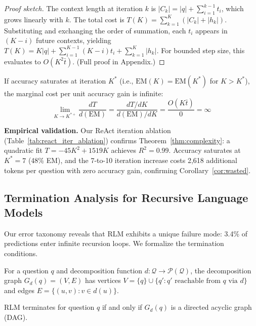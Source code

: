 \begin{proof}[Proof sketch]
The context length at iteration $k$ is $|C_k| = |q| + \sum_{i=1}^{k-1} t_i$, which grows linearly with $k$. The total cost is $T(K) = \sum_{k=1}^{K}(|C_k| + |h_k|)$. Substituting and exchanging the order of summation, each $t_i$ appears in $(K-i)$ future contexts, yielding $T(K) = K|q| + \sum_{i=1}^{K-1}(K-i)t_i + \sum_{k=1}^{K}|h_k|$. For bounded step size, this evaluates to $O(K^2 \bar{t})$. (Full proof in Appendix.)
\end{proof}

\begin{corollary}
\label{cor:wasted}
If accuracy saturates at iteration $K^*$ (i.e., $\mathrm{EM}(K) = \mathrm{EM}(K^*)$ for $K > K^*$), the marginal cost per unit accuracy gain is infinite:
\begin{equation}
\lim_{K \to K^{*+}} \frac{dT}{d(\mathrm{EM})} = \frac{dT/dK}{d(\mathrm{EM})/dK} = \frac{O(K\bar{t})}{0} = \infty
\end{equation}
\end{corollary}

\textbf{Empirical validation.} Our ReAct iteration ablation (Table~\ref{tab:react_iter_ablation}) confirms Theorem~\ref{thm:complexity}: a quadratic fit $T = -45K^2 + 1519K$ achieves $R^2 = 0.99$. Accuracy saturates at $K^*=7$ (48\% EM), and the 7-to-10 iteration increase costs 2,618 additional tokens per question with zero accuracy gain, confirming Corollary~\ref{cor:wasted}.

\subsection{Termination Analysis for Recursive Language Models}
\label{sec:theory:termination}

Our error taxonomy reveals that RLM exhibits a unique failure mode: 3.4\% of predictions enter infinite recursion loops. We formalize the termination conditions.

\begin{definition}
For a question $q$ and decomposition function $d: \mathcal{Q} \to \mathcal{P}(\mathcal{Q})$, the decomposition graph $G_d(q) = (V, E)$ has vertices $V = \{q\} \cup \{q' : q' \text{ reachable from } q \text{ via } d\}$ and edges $E = \{(u, v) : v \in d(u)\}$.
\end{definition}

\begin{theorem}
\label{thm:termination}
RLM terminates for question $q$ if and only if $G_d(q)$ is a directed acyclic graph (DAG).
\end{theorem}

